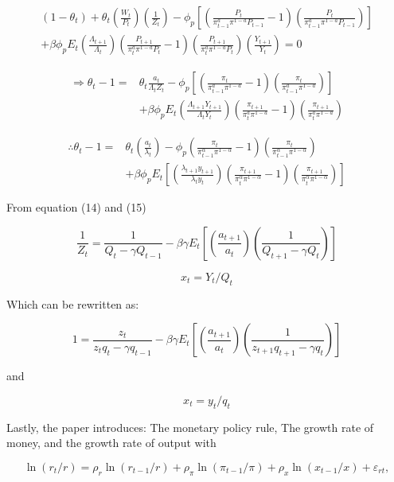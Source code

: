 \documentclass[11pt,preprint, authoryear]{elsarticle}
\numberwithin{equation}{section}
\numberwithin{figure}{section}
\numberwithin{table}{section}
\begin{document}
\[\begin{aligned} (1-\theta_t) + \theta_t (\frac{W_t}{P_t})(\frac{1}{Z_t}) - \phi_p[(\frac{P_t}{\pi_{t-1}^a \pi^{1-a}P_{t-1}}-1)(\frac{P_t}{\pi_{t-1}^a \pi^{1-a}P_{t-1}})] \\
+\beta\phi_pE_t(\frac{\Lambda_{t+1}}{\Lambda_{t}})(\frac{P_{t+1}}{\pi_t^a\pi^{1-a}P_{t}}-1)(\frac{P_{t+1}}{\pi_t^a\pi^{1-a}P_{t}})(\frac{Y_{t+1}}{Y_t})=0 \end{aligned}\]

\[\begin{aligned} \Rightarrow \theta_t - 1 = & \theta_t \frac{a_t}{\Lambda_t Z_t} - \phi_p[(\frac{\pi_t}{\pi_{t-1}^a \pi^{1-a}}-1)(\frac{\pi_t}{\pi_{t-1}^a \pi^{1-a}})] \\
& +\beta\phi_pE_t(\frac{\Lambda_{t+1}Y_{t+1}}{\Lambda_{t}Y_t})(\frac{\pi_{t+1}}{\pi_t^a\pi^{1-a}}-1)(\frac{\pi_{t+1}}{\pi_t^a\pi^{1-a}}) \end{aligned}\]

\[\begin{aligned} \therefore \theta_{t}-1=& \theta_{t}\left(\frac{a_{t}}{\lambda_{t}}\right)-\phi_{p}\left(\frac{\pi_{t}}{\pi_{t-1}^{\alpha} \pi^{1-\alpha}}-1\right)\left(\frac{\pi_{t}}{\pi_{t-1}^{\alpha} \pi^{1-\alpha}}\right) \\
&+\beta \phi_{p} E_{t}\left[\left(\frac{\lambda_{t+1} y_{t+1}}{\lambda_{t} y_{t}}\right)\left(\frac{\pi_{t+1}}{\pi_{t}^{\alpha} \pi^{1-\alpha}}-1\right)\left(\frac{\pi_{t+1}}{\pi_{t}^{\alpha} \pi^{1-\alpha}}\right)\right]
\end{aligned} \tag{13*}\]

From equation (14) and (15)

\[\frac{1}{Z_{t}}=\frac{1}{Q_{t}-\gamma Q_{t-1}}-\beta \gamma E_{t}\left[\left(\frac{a_{t+1}}{a_{t}}\right)\left(\frac{1}{Q_{t+1}-\gamma Q_{t}}\right)\right] \tag{14}\]

\[x_t = Y_t/Q_t \tag{15}\]

Which can be rewritten as:

\[1=\frac{z_{t}}{z_{t} q_{t}-\gamma q_{t-1}}-\beta \gamma E_{t}\left[\left(\frac{a_{t+1}}{a_{t}}\right)\left(\frac{1}{z_{t+1} q_{t+1}-\gamma q_{t}}\right)\right] \tag{14*}\]

and

\[x_t = y_t/q_t \tag{15*}\]

Lastly, the paper introduces: The monetary policy rule, The growth rate
of money, and the growth rate of output with

\[\ln \left(r_{t} / r\right)=\rho_{r} \ln \left(r_{t-1} / r\right)+\rho_{\pi} \ln \left(\pi_{t-1} / \pi\right)+\rho_{x} \ln \left(x_{t-1} / x\right)+\varepsilon_{r t}, \tag{16*}\]
\end{document}
